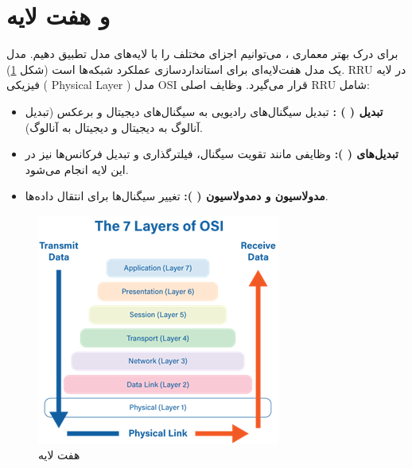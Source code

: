 \documentclass[landscape, 12pt]{report}
\begin{document}
\section*{
و
هفت لایه
}
برای درک بهتر معماری
 ، می‌توانیم اجزای مختلف
   را با لایه‌های مدل
    تطبیق دهیم. مدل
      یک مدل هفت‌لایه‌ای برای استانداردسازی عملکرد شبکه‌ها است (شکل \ref{fig:OSI7Layer}).
      RRU
      در لایه فیزیکی (
      Physical Layer
      ) مدل
       OSI
        قرار می‌گیرد. وظایف اصلی
         RRU
         شامل:
\begin{itemize}
\item
\textbf{ تبدیل
  (
  )
  :}
تبدیل سیگنال‌های رادیویی به سیگنال‌های دیجیتال و برعکس (تبدیل آنالوگ به دیجیتال و دیجیتال به آنالوگ).
\item 
\textbf{تبدیل‌های
  (
  ): }
وظایفی مانند تقویت سیگنال، فیلترگذاری و تبدیل فرکانس‌ها نیز در این لایه انجام می‌شود.
\item 
\textbf{مدولاسیون و دمدولاسیون
  (
  ):}
تغییر سیگنال‌ها برای انتقال داده‌ها. 
\end{itemize}
     \begin{figure}[ht]
     	\centering
     	\includegraphics[height=.3\linewidth]{Pic/OSI7Layer}
     	\caption{هفت لایه
     	}
     	\label{fig:OSI7Layer}
     \end{figure}
     
\end{document}
